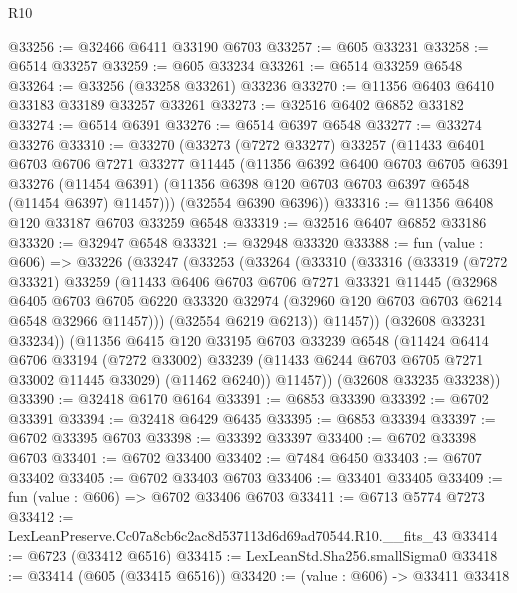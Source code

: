 \begin{lexlean}{R10}
\begin{coremodule}
@33256 := @32466 @6411 @33190 @6703
@33257 := @605 @33231
@33258 := @6514 @33257
@33259 := @605 @33234
@33261 := @6514 @33259 @6548
@33264 := @33256 (@33258 @33261) @33236
@33270 := @11356 @6403 @6410 @33183 @33189 @33257 @33261
@33273 := @32516 @6402 @6852 @33182
@33274 := @6514 @6391
@33276 := @6514 @6397 @6548
@33277 := @33274 @33276
@33310 := @33270
    (@33273
      (@7272 @33277)
      @33257
      (@11433
        @6401
        @6703
        @6706
        @7271
        @33277
        @11445
        (@11356
          @6392
          @6400
          @6703
          @6705
          @6391
          @33276
          (@11454 @6391)
          (@11356 @6398 @120 @6703 @6703 @6397 @6548 (@11454 @6397) @11457)))
      (@32554 @6390 @6396))
@33316 := @11356 @6408 @120 @33187 @6703 @33259 @6548
@33319 := @32516 @6407 @6852 @33186
@33320 := @32947 @6548
@33321 := @32948 @33320
@33388 := fun (value : @606) =>
  @33226
    (@33247
      (@33253
        (@33264
          (@33310
            (@33316
              (@33319
                (@7272 @33321)
                @33259
                (@11433
                  @6406
                  @6703
                  @6706
                  @7271
                  @33321
                  @11445
                  (@32968
                    @6405
                    @6703
                    @6705
                    @6220
                    @33320
                    @32974
                    (@32960 @120 @6703 @6703 @6214 @6548 @32966 @11457)))
                (@32554 @6219 @6213))
              @11457))
          (@32608 @33231 @33234))
        (@11356
          @6415
          @120
          @33195
          @6703
          @33239
          @6548
          (@11424
            @6414
            @6706
            @33194
            (@7272 @33002)
            @33239
            (@11433 @6244 @6703 @6705 @7271 @33002 @11445 @33029)
            (@11462 @6240))
          @11457))
      (@32608 @33235 @33238))
@33390 := @32418 @6170 @6164
@33391 := @6853 @33390
@33392 := @6702 @33391
@33394 := @32418 @6429 @6435
@33395 := @6853 @33394
@33397 := @6702 @33395 @6703
@33398 := @33392 @33397
@33400 := @6702 @33398 @6703
@33401 := @6702 @33400
@33402 := @7484 @6450
@33403 := @6707 @33402
@33405 := @6702 @33403 @6703
@33406 := @33401 @33405
@33409 := fun (value : @606) => @6702 @33406 @6703
@33411 := @6713 @5774 @7273
@33412 := LexLeanPreserve.Cc07a8cb6c2ac8d537113d6d69ad70544.R10.__fits_43
@33414 := @6723 (@33412 @6516)
@33415 := LexLeanStd.Sha256.smallSigma0
@33418 := @33414 (@605 (@33415 @6516))
@33420 := (value : @606) -> @33411 @33418

\end{coremodule}
\end{lexlean}
